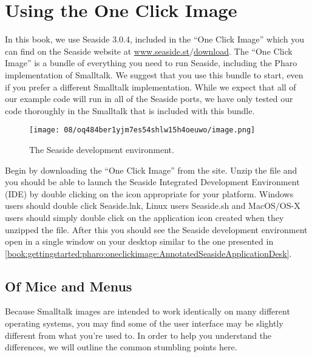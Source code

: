 \documentclass[a4paper,10pt,twoside]{book}
\newcommand{\ct}[1]{{\small\ttfamily\textup{#1}}}
\begin{document}
\section{Using the One Click Image}
\label{book:gettingstarted:pharo:oneclickimage}

In this book, we use Seaside 3.0.4, included in the ``One Click Image'' which you can find on the Seaside website at \href{http://www.seaside.st/download}{www.seaside.st$/$download}. The ``One Click Image'' is a bundle of everything you need to run Seaside, including the Pharo implementation of Smalltalk. We suggest that you use this bundle to start, even if you prefer a different Smalltalk implementation. While we expect that all of our example code will run in all of the Seaside ports, we have only tested our code thoroughly in the Smalltalk that is included with this bundle.

\begin{figure}[h!tbp]
	\begin{center}
		\texttt{[image: 08/oq484ber1yjm7es54shlw15h4oeuwo/image.png]}
		\caption{The Seaside development environment.\label{book:gettingstarted:pharo:oneclickimage:AnnotatedSeasideApplicationDesk}}
	\end{center}
\end{figure}


Begin by downloading the ``One Click Image'' from the site. Unzip the file and you should be able to launch the Seaside Integrated Development Environment (IDE) by double clicking on the icon appropriate for your platform. Windows users should double click \ct{Seaside.lnk}, Linux users \ct{Seaside.sh} and MacOS$/$OS-X users should simply double click on the application icon created when they unzipped the file. After this you should see the Seaside development environment open in a single window on your desktop similar to the one presented in \autoref{book:gettingstarted:pharo:oneclickimage:AnnotatedSeasideApplicationDesk}.

\subsection{Of Mice and Menus}
\label{book:gettingstarted:pharo:oneclickimage:miceandmenus}

Because Smalltalk images are intended to work identically on many different operating systems, you may find some of the user interface may be slightly different from what you're used to. In order to help you understand the differences, we will outline the common stumbling points here.
\end{document}
